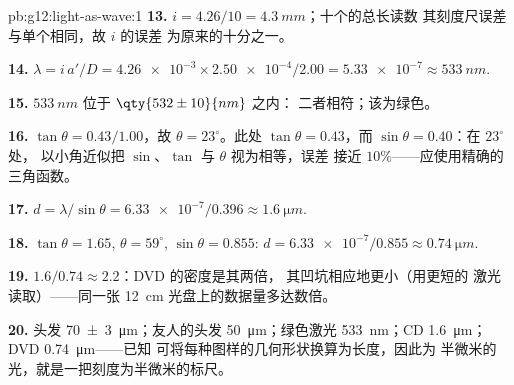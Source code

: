 \begin{solution}{pb:g12:light-as-wave:1}
\textbf{13.} $i = 4.26/10 = \qty{4.3}{mm}$；十个的总长读数
其刻度尺误差与单个相同，故 $i$ 的误差
为原来的十分之一。

\textbf{14.} $\lambda = i\,a'/D = \num{4.26e-3} \times
\num{2.50e-4}/2.00 = \num{5.33e-7} \approx \qty{533}{nm}$.

\textbf{15.} $\qty{533}{nm}$ 位于 $\qty{532 \pm 10}{nm}$ 之内：
二者相符；该为绿色。

\textbf{16.} $\tan\theta = 0.43/1.00$，故 $\theta = 23^\circ$。此处
$\tan\theta = 0.43$，而 $\sin\theta = 0.40$：在 $23^\circ$ 处，
以小角近似把 $\sin$、$\tan$ 与 $\theta$ 视为相等，误差
接近 $10\%$——应使用精确的三角函数。

\textbf{17.} $d = \lambda/\sin\theta = \num{6.33e-7}/0.396 \approx
\qty{1.6}{\micro m}$.

\textbf{18.} $\tan\theta = 1.65$, $\theta = 59^\circ$,
$\sin\theta = 0.855$: $d = \num{6.33e-7}/0.855 \approx
\qty{0.74}{\micro m}$.

\textbf{19.} $1.6/0.74 \approx 2.2$：DVD 的密度是其两倍，
其凹坑相应地更小（用更短的
激光读取）——同一张
\qty{12}{cm} 光盘上的数据量多达数倍。

\textbf{20.} 头发 \qty{70 \pm 3}{\micro m}；友人的头发
\qty{50}{\micro m}；绿色激光 \qty{533}{nm}；CD 
\qty{1.6}{\micro m}；DVD  \qty{0.74}{\micro m}——已知
可将每种图样的几何形状换算为长度，因此为
半微米的光，就是一把刻度为半微米的标尺。
\end{solution}
